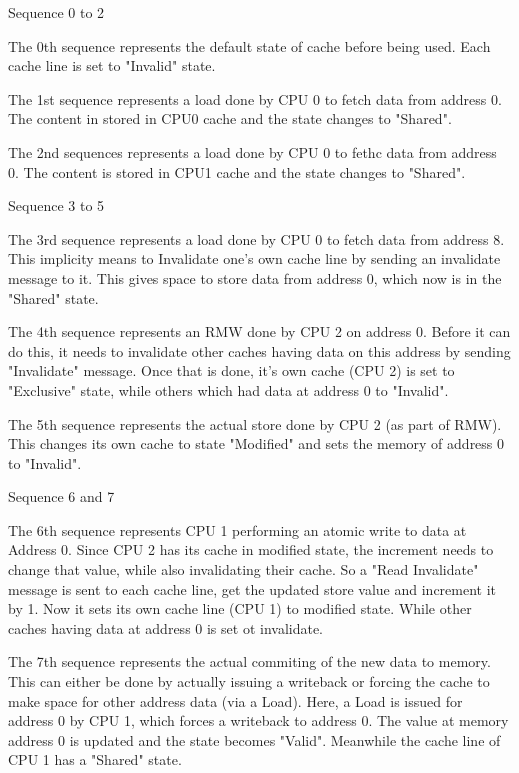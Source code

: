 \documentclass[notes, xcolor = dvipsnames]{beamer}
\begin{document}
    \begin{frame}{Sequence 0 to 2}

        The 0th sequence represents the default state of cache before being used. 
        Each cache line is set to "Invalid" state. 

        The 1st sequence represents a load done by CPU 0 to fetch data from address 0. 
        The content in stored in CPU0 cache and the state changes to "Shared".

        The 2nd sequences represents a load done by CPU 0 to fethc data from address 0.
        The content is stored in CPU1 cache and the state changes to "Shared".
        
    \end{frame}

    \begin{frame}{Sequence 3 to 5}

        The 3rd sequence represents a load done by CPU 0 to fetch data from address 8.
        This implicity means to Invalidate one's own cache line by sending an invalidate message to it. 
        This gives space to store data from address 0, which now is in the "Shared" state.

        The 4th sequence represents an RMW done by CPU 2 on address 0.
        Before it can do this, it needs to invalidate other caches having data on this address by sending "Invalidate" message.
        Once that is done, it's own cache (CPU 2) is set to "Exclusive" state, while others which had data at address 0 to "Invalid".
        
        The 5th sequence represents the actual store done by CPU 2 (as part of RMW).
        This changes its own cache to state "Modified" and sets the memory of address 0 to "Invalid".
    \end{frame}

    \begin{frame}{Sequence 6 and 7}

        The 6th sequence represents CPU 1 performing an atomic write to data at Address 0.
        Since CPU 2 has its cache in modified state, the increment needs to change that value, while also invalidating their cache. 
        So a "Read Invalidate" message is sent to each cache line, get the updated store value and increment it by 1.
        Now it sets its own cache line (CPU 1) to modified state. 
        While other caches having data at address 0 is set ot invalidate. 

        The 7th sequence represents the actual commiting of the new data to memory. 
        This can either be done by actually issuing a writeback or forcing the cache to make space for other address data (via a Load).
        Here, a Load is issued for address 0 by CPU 1, which forces a writeback to address 0.
        The value at memory address 0 is updated and the state becomes "Valid".
        Meanwhile the cache line of CPU 1 has a "Shared" state.
        
    \end{frame}
\end{document}

